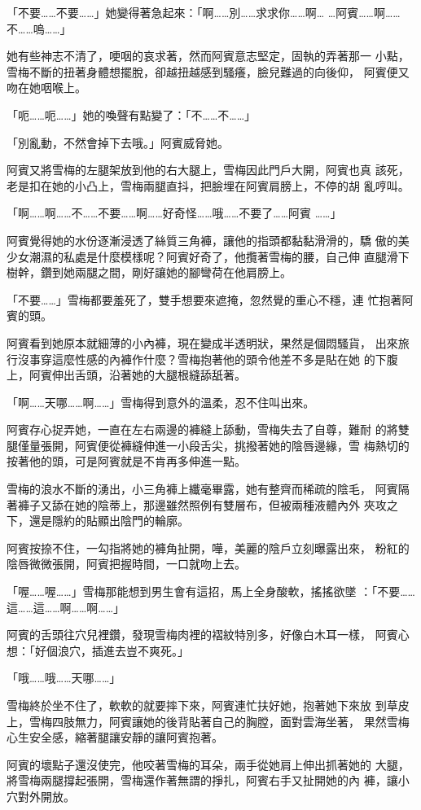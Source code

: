 「不要……不要……」她變得著急起來：「啊……別……求求你……啊…
…阿賓……啊……不……嗚……」

她有些神志不清了，哽咽的哀求著，然而阿賓意志堅定，固執的弄著那一
小點，雪梅不斷的扭著身體想擺脫，卻越扭越感到騷癢，臉兒難過的向後仰，
阿賓便又吻在她咽喉上。

「呃……呃……」她的喚聲有點變了：「不……不……」

「別亂動，不然會掉下去哦。」阿賓威脅她。

阿賓又將雪梅的左腿架放到他的右大腿上，雪梅因此門戶大開，阿賓也真
該死，老是扣在她的小凸上，雪梅兩腿直抖，把臉埋在阿賓肩膀上，不停的胡
亂哼叫。

「啊……啊……不……不要……啊……好奇怪……哦……不要了……阿賓
……」

阿賓覺得她的水份逐漸浸透了絲質三角褲，讓他的指頭都黏黏滑滑的，驕
傲的美少女潮濕的私處是什麼模樣呢？阿賓好奇了，他攬著雪梅的腰，自己伸
直腿滑下樹幹，鑽到她兩腿之間，剛好讓她的腳彎荷在他肩膀上。

「不要……」雪梅都要羞死了，雙手想要來遮掩，忽然覺的重心不穩，連
忙抱著阿賓的頭。

阿賓看到她原本就細薄的小內褲，現在變成半透明狀，果然是個悶騷貨，
出來旅行沒事穿這麼性感的內褲作什麼？雪梅抱著他的頭令他差不多是貼在她
的下腹上，阿賓伸出舌頭，沿著她的大腿根縫舔舐著。

「啊……天哪……啊……」雪梅得到意外的溫柔，忍不住叫出來。

阿賓存心捉弄她，一直在左右兩邊的褲縫上舔動，雪梅失去了自尊，難耐
的將雙腿僅量張開，阿賓便從褲縫伸進一小段舌尖，挑撥著她的陰唇邊緣，雪
梅熱切的按著他的頭，可是阿賓就是不肯再多伸進一點。

雪梅的浪水不斷的湧出，小三角褲上纖毫畢露，她有整齊而稀疏的陰毛，
阿賓隔著褲子又舔在她的陰蒂上，那邊雖然照例有雙層布，但被兩種液體內外
夾攻之下，還是隱約的貼顯出陰門的輪廓。

阿賓按捺不住，一勾指將她的褲角扯開，嘩，美麗的陰戶立刻曝露出來，
粉紅的陰唇微微張開，阿賓把握時間，一口就吻上去。

「喔……喔……」雪梅那能想到男生會有這招，馬上全身酸軟，搖搖欲墜
：「不要……這……這……啊……啊……」

阿賓的舌頭往穴兒裡鑽，發現雪梅肉裡的褶紋特別多，好像白木耳一樣，
阿賓心想：「好個浪穴，插進去豈不爽死。」

「哦……哦……天哪……」

雪梅終於坐不住了，軟軟的就要摔下來，阿賓連忙扶好她，抱著她下來放
到草皮上，雪梅四肢無力，阿賓讓她的後背貼著自己的胸膛，面對雲海坐著，
果然雪梅心生安全感，縮著腿讓安靜的讓阿賓抱著。

阿賓的壞點子還沒使完，他咬著雪梅的耳朵，兩手從她肩上伸出抓著她的
大腿，將雪梅兩腿撐起張開，雪梅還作著無謂的掙扎，阿賓右手又扯開她的內
褲，讓小穴對外開放。

